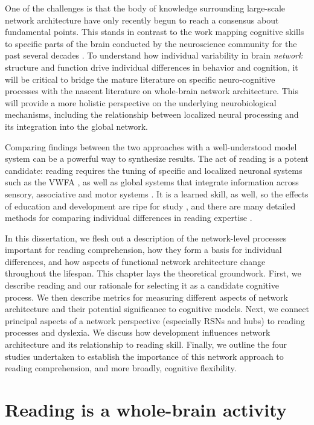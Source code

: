 One of the challenges is that the body of knowledge surrounding large-scale network architecture have only recently begun to reach a consensus about fundamental points. This stands in contrast to the work mapping cognitive skills to specific parts of the brain conducted by the neuroscience community for the past several decades \citep{Yarkoni2011}. To understand how individual variability in brain \textit{network} structure and function drive individual differences in behavior and cognition, it will be critical to bridge the mature literature on specific neuro-cognitive processes with the nascent literature on whole-brain network architecture. This will provide a more holistic perspective on the underlying neurobiological mechanisms, including the relationship between localized neural processing and its integration into the global network. 

Comparing findings between the two approaches with a well-understood model system can be a powerful way to synthesize results. The act of reading is a potent candidate: reading requires the tuning of specific and localized neuronal systems such as the VWFA \citep{McCandliss2003}, as well as global systems that integrate information across sensory, associative and motor systems \citep{Price2012}. It is a learned skill, as well, so the effects of education and development are ripe for study \citep{Saygin2016}, and there are many detailed methods for comparing individual differences in reading expertise \citep{Woodcock1998}. 

In this dissertation, we flesh out a description of the network-level processes important for reading comprehension, how they form a basis for individual differences, and how aspects of functional network architecture change throughout the lifespan. This chapter lays the theoretical groundwork. First, we describe reading and our rationale for selecting it as a candidate cognitive process. We then describe metrics for measuring different aspects of network architecture and their potential significance to cognitive models. Next, we connect principal aspects of a network perspective (especially RSNs and hubs) to reading processes and dyslexia. We discuss how development influences network architecture and its relationship to reading skill. Finally, we outline the four studies undertaken to establish the importance of this network approach to reading comprehension, and more broadly, cognitive flexibility.

\section{Reading is a whole-brain activity}

